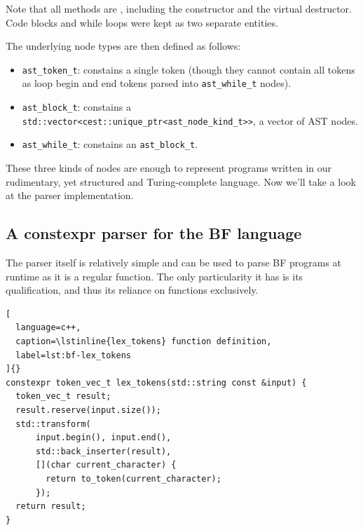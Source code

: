 \documentclass[../../main.tex]{subfiles}
\begin{document}
% 

Note that all methods are \constexpr, including the constructor and the virtual
destructor. Code blocks and while loops were kept as two separate entities.

% 

The underlying node types are then defined as follows:

\begin{itemize}
\item \lstinline|ast_token_t|: constains a single token (though they cannot
      contain all tokens as loop begin and end tokens parsed into
      \lstinline|ast_while_t| nodes).
\item \lstinline|ast_block_t|: constains a
      \lstinline|std::vector<cest::unique_ptr<ast_node_kind_t>>|, \ie a vector
      of AST nodes.
\item \lstinline|ast_while_t|: constains an \lstinline|ast_block_t|.
\end{itemize}

These three kinds of nodes are enough to represent programs written in our
rudimentary, yet structured and Turing-complete language. Now we'll take a look
at the \constexpr parser implementation.

\subsection{A constexpr parser for the BF language}

The parser itself is relatively simple and can be used to parse BF programs at
runtime as it is a regular \cpp function. The only particularity it has is its
\constexpr qualification, and thus its reliance on \constexpr functions
exclusively.

\begin{lstlisting}[
  language=c++,
  caption=\lstinline{lex_tokens} function definition,
  label=lst:bf-lex_tokens
]{}
constexpr token_vec_t lex_tokens(std::string const &input) {
  token_vec_t result;
  result.reserve(input.size());
  std::transform(
      input.begin(), input.end(),
      std::back_inserter(result),
      [](char current_character) {
        return to_token(current_character);
      });
  return result;
}
\end{lstlisting}
\end{document}
